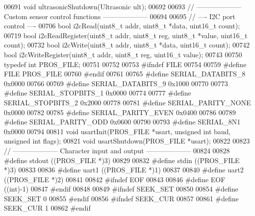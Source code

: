 \begin{DoxyCode}
00691 \textcolor{keywordtype}{void} ultrasonicShutdown(Ultrasonic ult);
00692 
00693 \textcolor{comment}{// -------------------- Custom sensor control functions --------------------}
00694 
00695 \textcolor{comment}{// ---- I2C port control ----}
00706 \textcolor{comment}{}\textcolor{keywordtype}{bool} i2cRead(uint8\_t addr, uint8\_t *data, uint16\_t count);
00719 \textcolor{keywordtype}{bool} i2cReadRegister(uint8\_t addr, uint8\_t reg, uint8\_t *value, uint16\_t count);
00732 \textcolor{keywordtype}{bool} i2cWrite(uint8\_t addr, uint8\_t *data, uint16\_t count);
00742 \textcolor{keywordtype}{bool} i2cWriteRegister(uint8\_t addr, uint8\_t reg, uint16\_t value);
00743 
00750 \textcolor{keyword}{typedef} \textcolor{keywordtype}{int} PROS_FILE;
00751 
00752 
00753 \textcolor{preprocessor}{#ifndef FILE}
00754 
00759 \textcolor{preprocessor}{#define FILE PROS\_FILE}
00760 \textcolor{preprocessor}{#endif}
00761 
00765 \textcolor{preprocessor}{#define SERIAL\_DATABITS\_8 0x0000}
00766 
00769 \textcolor{preprocessor}{#define SERIAL\_DATABITS\_9 0x1000}
00770 
00773 \textcolor{preprocessor}{#define SERIAL\_STOPBITS\_1 0x0000}
00774 
00777 \textcolor{preprocessor}{#define SERIAL\_STOPBITS\_2 0x2000}
00778 
00781 \textcolor{preprocessor}{#define SERIAL\_PARITY\_NONE 0x0000}
00782 
00785 \textcolor{preprocessor}{#define SERIAL\_PARITY\_EVEN 0x0400}
00786 
00789 \textcolor{preprocessor}{#define SERIAL\_PARITY\_ODD 0x0600}
00790 
00793 \textcolor{preprocessor}{#define SERIAL\_8N1 0x0000}
00794 
00811 \textcolor{keywordtype}{void} usartInit(PROS\_FILE *usart, \textcolor{keywordtype}{unsigned} \textcolor{keywordtype}{int} baud, \textcolor{keywordtype}{unsigned} \textcolor{keywordtype}{int} flags);
00821 \textcolor{keywordtype}{void} usartShutdown(PROS\_FILE *usart);
00822 
00823 \textcolor{comment}{// -------------------- Character input and output --------------------}
00824 
00828 \textcolor{preprocessor}{#define stdout ((PROS\_FILE *)3)}
00829 
00832 \textcolor{preprocessor}{#define stdin ((PROS\_FILE *)3)}
00833 
00836 \textcolor{preprocessor}{#define uart1 ((PROS\_FILE *)1)}
00837 
00840 \textcolor{preprocessor}{#define uart2 ((PROS\_FILE *)2)}
00841 
00842 \textcolor{preprocessor}{#ifndef EOF}
00843 
00846 \textcolor{preprocessor}{#define EOF ((int)-1)}
00847 \textcolor{preprocessor}{#endif}
00848 
00849 \textcolor{preprocessor}{#ifndef SEEK\_SET}
00850 
00854 \textcolor{preprocessor}{#define SEEK\_SET 0}
00855 \textcolor{preprocessor}{#endif}
00856 \textcolor{preprocessor}{#ifndef SEEK\_CUR}
00857 
00861 \textcolor{preprocessor}{#define SEEK\_CUR 1}
00862 \textcolor{preprocessor}{#endif}

\end{DoxyCode}
